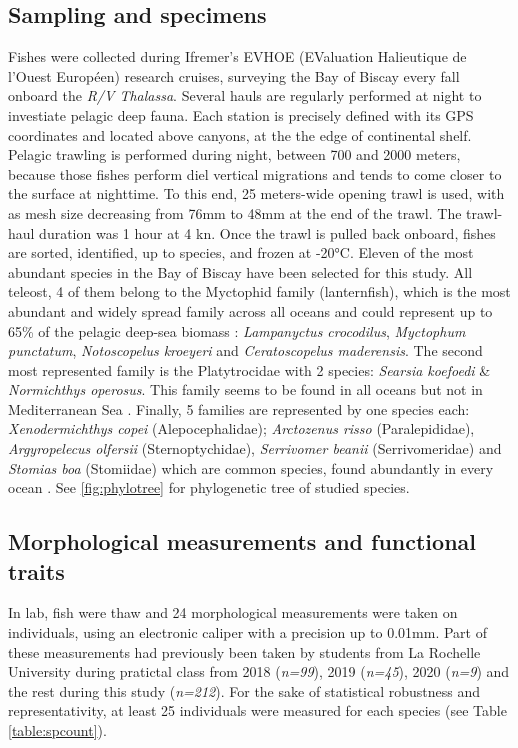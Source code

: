 

\subsection{Sampling and specimens}

Fishes were collected during Ifremer's EVHOE (EValuation Halieutique de l'Ouest Européen) research cruises, surveying the Bay of Biscay every fall onboard the \textit{R/V Thalassa}.
Several hauls are regularly performed at night to investiate pelagic deep fauna. Each station is precisely defined with its GPS coordinates and located above canyons, at the the edge of continental shelf. 
Pelagic trawling is performed during night, between 700 and 2000 meters, because those fishes perform diel vertical migrations and tends to come closer to the surface at nighttime. To this end, 25 meters-wide opening trawl is used, with as mesh size decreasing from 76mm to 48mm at the end of the trawl. The trawl-haul duration was 1 hour at 4 kn. 
Once the trawl is pulled back onboard, fishes are sorted, identified, up to species, and frozen at -20°C. Eleven of the most abundant species in the Bay of Biscay have been selected for this study. All teleost, 4 of them belong to the Myctophid family (lanternfish), which is the most abundant and widely spread family across all oceans \citep{debusserolles2014} and could represent up to 65\% of the pelagic deep-sea biomass \citep{poulsen2013}: \textit{Lampanyctus crocodilus}, \textit{Myctophum punctatum}, \textit{Notoscopelus kroeyeri} and \textit{Ceratoscopelus maderensis}. The second most represented family is the Platytrocidae with 2 species: \textit{Searsia koefoedi} \& \textit{Normichthys operosus}. This family seems to be found in all oceans but not in Mediterranean Sea \citep{orrell2016}. Finally, 5 families are represented by one species each: \textit{Xenodermichthys copei} (Alepocephalidae); \textit{Arctozenus risso} (Paralepididae), \textit{Argyropelecus olfersii} (Sternoptychidae), \textit{Serrivomer beanii} (Serrivomeridae) and \textit{Stomias boa} (Stomiidae) which are common species, found abundantly in every ocean \citep{carvalho1988,froese2019,geidner2008,germain2019}. See \ref{fig:phylotree} for phylogenetic tree of studied species. 


\subsection{Morphological measurements and functional traits}
In lab, fish were thaw and 24 morphological measurements were taken on individuals, using an electronic caliper with a precision up to 0.01mm. Part of these measurements had previously been taken by students from La Rochelle University during pratictal class from 2018 (\textit{n=99}), 2019 (\textit{n=45}), 2020 (\textit{n=9}) and the rest during this study (\textit{n=212}). For the sake of statistical robustness and representativity, at least 25 individuals were measured for each species (see Table \ref{table:spcount}).  

